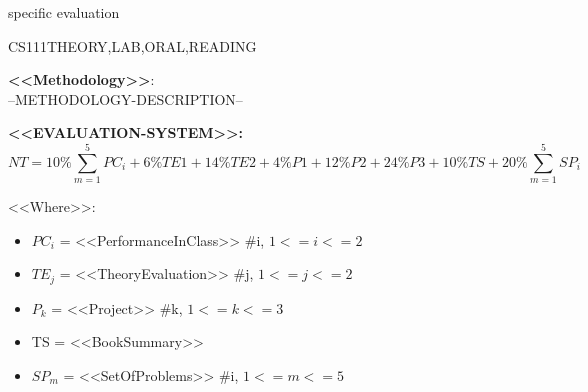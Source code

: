 specific evaluation
\begin{evaluation}{CS111}{THEORY,LAB,ORAL,READING}

\vspace{2mm}
{\noindent\bf <<Methodology>>}:\\ 
--METHODOLOGY-DESCRIPTION--

\vspace{2mm}
{\noindent\bf <<EVALUATION-SYSTEM>>:}\\
\begin{equation}
NT=10\%\sum_{m=1}^{5} PC_i +6\%TE1+14\%TE2+4\%P1+12\%P2+24\%P3+10\%TS + 20\%\sum_{m=1}^{5} SP_i
\end{equation}

<<Where>>:
\begin{itemize}
  \item $PC_{i}$ = <<PerformanceInClass>> \#i, $1 <= i <=2$
  \item $TE_{j}$ = <<TheoryEvaluation>> \#j, $1 <= j <=2$
  \item $P_{k}$ = <<Project>> \#k, $1 <= k <=3$
  \item TS  = <<BookSummary>>
  \item $SP_{m}$ = <<SetOfProblems>> \#i, $1 <= m <=5$
\end{itemize}

\end{evaluation}

